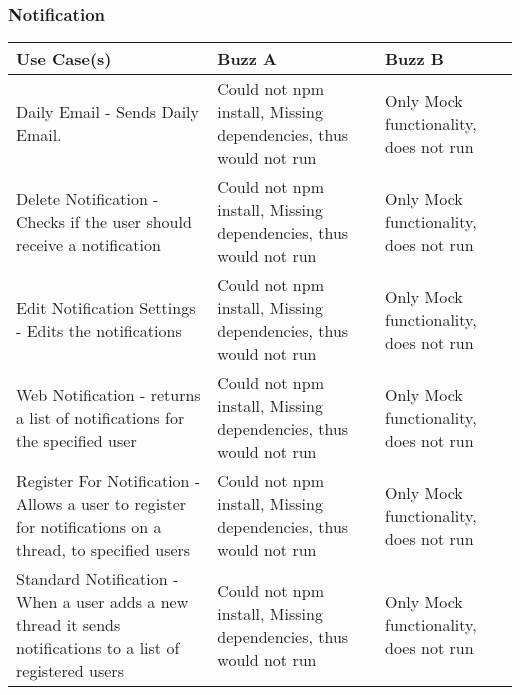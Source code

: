 \documentclass[12pt]{article}
\begin{document}
\subsubsection{Notification}%
\begin{tabular}{|p{4.5cm}|p{4.5cm}|p{4.5cm}|}

\hline
Use Case(s) & Buzz A & Buzz B \\ 
\hline
Daily Email - Sends Daily Email. & Could not npm install, Missing dependencies, thus would not run & Only Mock functionality, does not run \\ %
\hline
Delete Notification - Checks if the user should receive a notification & Could not npm install, Missing dependencies, thus would not run & Only Mock functionality, does not run\\ %
\hline
Edit Notification Settings - Edits the notifications  & Could not npm install, Missing dependencies, thus would not run & Only Mock functionality, does not run\\ %
\hline
Web Notification - returns a list of notifications for the specified user & Could not npm install, Missing dependencies, thus would not run & Only Mock functionality, does not run \\ %
\hline
Register For Notification - Allows a user to register for notifications on a thread, to specified users  & Could not npm install, Missing dependencies, thus would not run & Only Mock functionality, does not run \\ %
\hline
Standard Notification - When a user adds a new thread it sends notifications to a list of registered users & Could not npm install, Missing dependencies, thus would not run & Only Mock functionality, does not run\\ %
\hline


\end{tabular}
\end{document}
